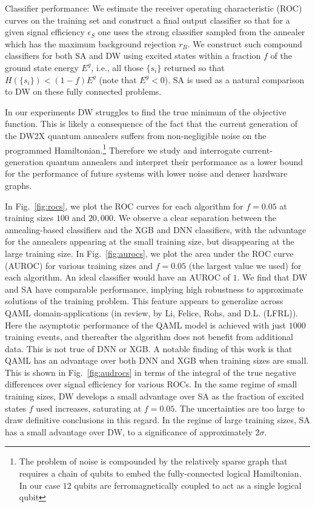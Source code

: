 \documentclass[fleqn,10pt]{wlscirep}
\begin{document}
{Classifier performance}:
We estimate the receiver operating characteristic  (ROC) curves on the training set and construct a final output classifier so that for a given signal efficiency $\epsilon_S$ one uses the strong classifier sampled from the annealer which has the maximum background rejection $r_B$. We construct such compound classifiers for both SA and DW using excited states within a fraction $f$ of the ground state energy $E^g$, i.e., all those $\{s_i\}$ returned so that $H(\{s_i\})<(1-f)E^g$ (note that $E^g<0$). SA is used as a natural comparison to DW on these fully connected problems.

In our experiments DW struggles to find the true minimum of the objective function. This is likely a consequence of the fact that the current generation of the DW2X quantum annealers suffers from non-negligible noise on the programmed Hamiltonian.\footnote{The problem of noise is compounded by the relatively sparse graph that requires a chain of qubits to embed the fully-connected logical Hamiltonian. In our case  $12$ qubits are ferromagnetically coupled  to act as a single logical qubit} Therefore we study and  interrogate current-generation quantum annealers and interpret their performance as a lower bound for the performance of future systems with lower noise and denser hardware graphs. 

In Fig.~\ref{fig:rocs}, we plot the ROC curves for each algorithm for $f=0.05$ at training sizes $100$ and $20,000$.  We observe a clear separation between the annealing-based classifiers and the XGB and DNN classifiers, with the advantage for the annealers appearing at the small training size, but disappearing at the large training size. In Fig.~\ref{fig:aurocs}, we plot the area under the ROC curve (AUROC) for various training sizes and $f=0.05$ (the largest value we used)  for each algorithm. An ideal classifier would have an AUROC of $1$. We find that DW and SA have comparable performance, implying high robustness to approximate solutions of the training problem. This feature appears to generalize across QAML domain-applications (in review, by Li, Felice, Rohs, and D.L. (LFRL)).
Here the  asymptotic performance of the QAML model is achieved with just $1000$ training events, and thereafter the algorithm does not benefit from additional data.  This is not true of DNN or XGB. A notable finding of this work is that QAML has an advantage over both DNN and XGB when training sizes are small. This is shown in Fig.~\ref{fig:audrocs} in terms of the integral of the true negative differences over signal efficiency for various ROCs. In the same regime of small training sizes, DW develops a small advantage over SA as the fraction of excited states $f$ used increases, saturating at $f=0.05$. The uncertainties are too large to draw definitive conclusions in this regard. In the regime of large training sizes, SA has a small advantage over DW, to a significance of approximately $2\sigma$.
\end{document}
